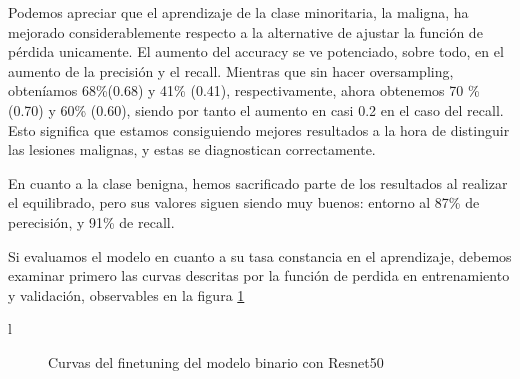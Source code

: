 Podemos apreciar que el aprendizaje de la clase minoritaria, la maligna, ha mejorado considerablemente respecto a la alternative de ajustar la función de pérdida unicamente. El aumento del accuracy se ve potenciado, sobre todo, en el aumento de la precisión y el recall. Mientras que sin hacer oversampling, obteníamos 68\%(0.68) y 41\% (0.41), respectivamente, ahora obtenemos 70 \% (0.70) y 60\% (0.60), siendo por tanto el aumento en casi 0.2 en el caso del recall. Esto significa que estamos consiguiendo mejores resultados a la hora de distinguir las lesiones malignas, y estas se diagnostican correctamente.

En cuanto a la clase benigna, hemos sacrificado parte de los resultados al realizar el equilibrado, pero sus valores siguen siendo muy buenos: entorno al 87\% de perecisión, y 91\% de recall.


Si evaluamos el modelo en cuanto a su tasa constancia en el aprendizaje, debemos examinar primero las curvas descritas por la función de perdida en entrenamiento y validación, observables en la figura \ref{fig:curvasrensetbinaria}

l\begin{figure}[H]
	\centering
	\caption{Curvas del finetuning del modelo binario con Resnet50}
	\label{fig:curvasrensetbinaria}
	
\end{figure}

